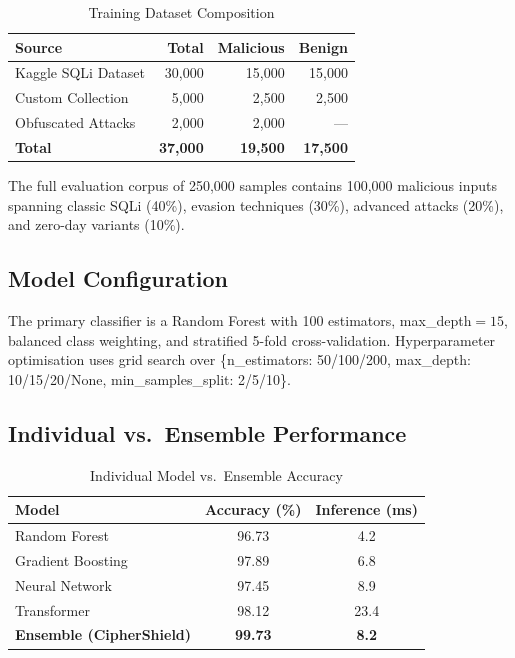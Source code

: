 \documentclass[10pt, twocolumn]{article}
\begin{document}
\begin{table}[H]
\centering
\caption{Training Dataset Composition}
\label{tab:dataset}
\small
\begin{tabular}{lrrr}
\toprule
\textbf{Source} & \textbf{Total} & \textbf{Malicious} & \textbf{Benign} \\
\midrule
Kaggle SQLi Dataset   & 30,000  & 15,000  & 15,000  \\
Custom Collection     &  5,000  &  2,500  &  2,500  \\
Obfuscated Attacks    &  2,000  &  2,000  &    ---  \\
\midrule
\textbf{Total}        & \textbf{37,000} & \textbf{19,500} & \textbf{17,500} \\
\bottomrule
\end{tabular}
\end{table}

The full evaluation corpus of 250,000 samples contains 100,000 malicious 
inputs spanning classic SQLi (40\%), evasion techniques (30\%), advanced 
attacks (20\%), and zero-day variants (10\%).

\subsection{Model Configuration}

The primary classifier is a Random Forest with 100 estimators, 
max\_depth$=15$, balanced class weighting, and stratified 5-fold 
cross-validation. Hyperparameter optimisation uses grid search over 
\{n\_estimators: 50/100/200, max\_depth: 10/15/20/None, 
min\_samples\_split: 2/5/10\}.

\subsection{Individual vs.\ Ensemble Performance}

\begin{table}[H]
\centering
\caption{Individual Model vs.\ Ensemble Accuracy}
\label{tab:models}
\small
\begin{tabular}{lcc}
\toprule
\textbf{Model} & \textbf{Accuracy (\%)} & \textbf{Inference (ms)} \\
\midrule
Random Forest         & 96.73 & 4.2  \\
Gradient Boosting     & 97.89 & 6.8  \\
Neural Network        & 97.45 & 8.9  \\
Transformer           & 98.12 & 23.4 \\
\textbf{Ensemble (CipherShield)} & \textbf{99.73} & \textbf{8.2} \\
\bottomrule
\end{tabular}
\end{table}
\end{document}
